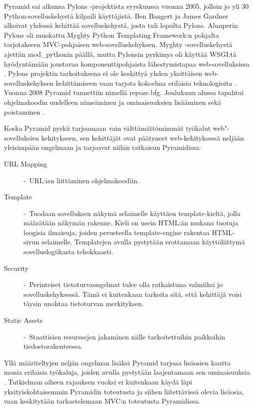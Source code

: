 \documentclass[utf8]{gradu3}
\begin{document}
Pyramid sai alkunsa Pylons -projektista syyskuussa vuonna 2005, jolloin jo yli 30 Python-sovelluskehystä kilpaili käyttäjistä. Ben Bangert ja James Gardner alkoivat yhdessä kehittää sovelluskehystä, josta tuli lopulta Pylons. Alunperin Pylons oli
muokattu Myghty Python Templating Framework:n pohjalta tarjotakseen MVC-pohjaisen web-sovelluskehyksen. Myghty -sovelluskehystä ajettiin mod\_pythonin päällä, mutta Pylonsin pyrkimys oli käyttää WSGI:tä hyödyntämään joustavaa komponenttipohjaista lähestymistapaa web-sovelluksissa \parencite{pyramid_history}. Pylons projektin tarkoituksena ei ole keskittyä yhden yksittäisen web-sovelluskehyksen kehittämiseen vaan tarjota kokoelma erilaisia teknologioita \parencite{pylons_about}. Vuonna 2008 Pyramid tunnettiin nimellä repoze.bfg. Joulukuun alussa tapahtui ohjelmakoodin uudelleen nimeäminen ja ominaisuuksien lisääminen sekä poistaminen \parencite{pyramid_about}.

Koska Pyramid pyrkii tarjoamaan vain välttämättömimmät työkalut web"-sovelluksien kehitykseen, sen kehittäjät
ovat päätyneet web-kehityksessä neljään yleisimpään ongelmaan ja tarjoavat niihin ratkaisun Pyramidissa:

\begin{description}
\item [URL Mapping] -\ URL:ien liittäminen ohjelmakoodiin.
\item[Template] -\ Tuodaan sovelluksen näkymä selaimelle käyttäen template-kieltä, jolla määrätään näkymän rakenne. Kieli on usein HTML:än mukana tuotuja loogisia ilmaisuja, joiden perusteella template-engine rakentaa HTML-sivun selaimelle. Templatejen avulla pystytään erottamaan käyttöliittymä sovelluslogiikasta tehokkaasti.
\item[Security] -\ Perinteiset tietoturvaongelmat tulee olla ratkaistuna valmiiksi jo sovelluskehyksessä. Tämä ei kuitenkaan tarkoita sitä, että kehittäjä voisi täysin unohtaa tietoturvan merkityksen.
\item[Static Assets] -\ Staattisien resurssejen jakaminen niille tarkoitettuihin paikkoihin tiedostorakenteessa.
\end{description}
Yllä määriteltyjen neljän ongelman lisäksi Pyramid tarjoaa lisäosien kautta monia erilaisia työkaluja, joiden avulla pystytään laajentamaan sen ominaisuuksia \parencite{pyramid_intr}. Tutkielman aiheen rajauksen vuoksi ei kuitenkaan
käydä läpi yksityiskohtaisemmin Pyramidin toteutusta ja siihen liitettävissä olevia lisäosia, vaan keskitytään tarkastelemaan MVC:n toteutusta Pyramidissa.
\end{document}

